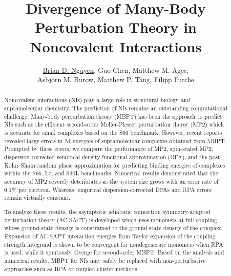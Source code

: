\documentclass[12pt]{article}
\title{Divergence of Many-Body Perturbation Theory in Noncovalent Interactions}
\author{\underline{Brian D. Nguyen},
  Guo Chen, Matthew M. Agee, \\ Asbj{\"o}rn M. Burow,
  Matthew P. Tang,
  Filipp Furche}
\begin{document}
\maketitle

\begin{abstract}
  Noncovalent interactions (NIs) play a large role in structural biology
  and supramolecular chemistry. The prediction of NIs remains an outstanding
  computational challenge. Many-body perturbation theory (MBPT) has been the
  approach to predict NIs such as the efficient second-order M{\o}ller-Plesset
  perturbation theroy (MP2) which is accurate for small complexes
  based on the S66 benchmark. However, recent reports revealed large errors
  in NI energies of supramolecular complexes obtained from MBPT.
  Prompted by these errors, we compare the performance of MP2, spin-scaled MP2,
  dispersion-corrected semilocal density functional approximation (DFA),
  and the post-Kohn--Sham random phase approximation for predicting binding
  energies of complexes within the S66, L7, and S30L benchmarks. Numerical
  results demonstrated that the accuracy of MP2 severely deteriorates as
  the system size grows with an error rate of $0.1\%$ per electron.
  Whereas, empirical dispersion-corrected DFAs and RPA errors remain virtually
  constant.

  To analyze these results, the asymptotic adiabatic connection
  symmetry-adapted perturbation theory (AC-SAPT) is developed which uses
  monomers at full coupling whose ground-state density is constrained to
  the ground-state density of the complex. Expansion of AC-SAPT interaction energies
  from Taylor expansion of the coupling strength integrand is shown to be convergent
  for nondegenerate monomers when RPA is used, while it spuriously diverge for
  second-order MBPT. Based on the analysis and numerical results, MBPT for
  NIs may safely be replaced with non-perturbative approaches such as RPA
  or coupled cluster methods.

\end{abstract}
\end{document}
